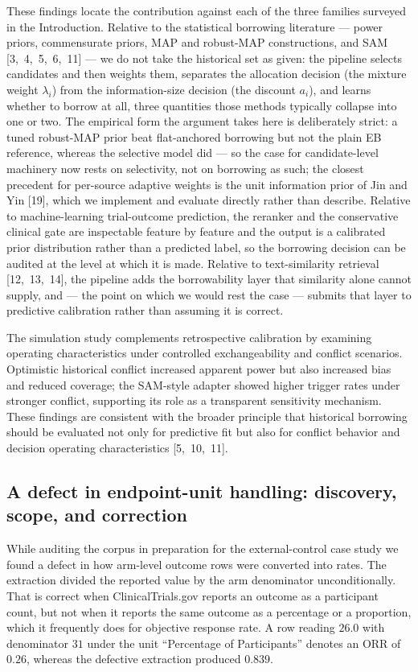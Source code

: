 \documentclass[11pt]{article}
\begin{document}
These findings locate the contribution against each of the three families
surveyed in the Introduction. Relative to the statistical borrowing literature
--- power priors, commensurate priors, MAP and robust-MAP constructions, and
SAM [3,~4,~5,~6,~11] --- we do not take the historical set as given: the
pipeline selects candidates and then weights them, separates the
allocation decision (the mixture weight $\lambda_i$) from the information-size
decision (the discount $a_i$), and learns whether to borrow at all, three
quantities those methods typically collapse into one or two. The empirical
form the argument takes here is deliberately strict: a tuned robust-MAP prior
beat flat-anchored borrowing but not the plain EB reference, whereas the
selective model did --- so the case for candidate-level machinery now rests on
selectivity, not on borrowing as such; the closest precedent for per-source
adaptive weights is the unit
information prior of Jin and Yin [19], which we implement and evaluate directly
rather than describe. Relative to machine-learning trial-outcome prediction, the
reranker and the conservative clinical gate are inspectable feature by feature
and the output is a calibrated prior distribution rather than a predicted
label, so the borrowing decision can be audited at the level at which it is
made. Relative to text-similarity retrieval [12,~13,~14], the pipeline adds the
borrowability layer that similarity alone cannot supply, and --- the point on
which we would rest the case --- submits that layer to predictive calibration
rather than assuming it is correct.

The simulation study complements retrospective calibration by examining
operating characteristics under controlled exchangeability and conflict
scenarios. Optimistic historical conflict increased apparent power but also
increased bias and reduced coverage; the SAM-style adapter showed higher
trigger rates under stronger conflict, supporting its role as a transparent
sensitivity mechanism. These findings are consistent with the broader
principle that historical borrowing should be evaluated not only for
predictive fit but also for conflict behavior and decision operating
characteristics [5,~10,~11].

\subsection{A defect in endpoint-unit handling: discovery, scope, and correction}
\label{sec:limitations-data}

While auditing the corpus in preparation for the external-control case study we
found a defect in how arm-level outcome rows were converted into rates. The
extraction divided the reported value by the arm denominator unconditionally.
That is correct when ClinicalTrials.gov reports an outcome as a participant
count, but not when it reports the same outcome as a percentage or a proportion,
which it frequently does for objective response rate. A row reading $26.0$ with
denominator $31$ under the unit ``Percentage of Participants'' denotes an ORR of
$0.26$, whereas the defective extraction produced $0.839$.
\end{document}
